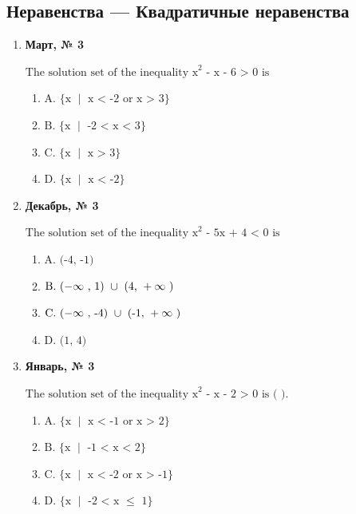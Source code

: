 \subsection*{Неравенства — Квадратичные неравенства}
\begin{enumerate}
\item \textbf{Март, № 3} \par \smallskip
$\displaystyle \text{The solution set of the inequality x}^{2}\text{ - x - 6 > 0 is}$
\begin{enumerate}
\item $\displaystyle \text{A. }\{\text{x }\mid\text{ x < -2 or x > 3}\}$
\item $\displaystyle \text{B. }\{\text{x }\mid\text{ -2 < x < 3}\}$
\item $\displaystyle \text{C. }\{\text{x }\mid\text{ x > 3}\}$
\item $\displaystyle \text{D. }\{\text{x }\mid\text{ x < -2}\}$
\end{enumerate}
\item \textbf{Декабрь, № 3} \par \smallskip
$\displaystyle \text{The solution set of the inequality x}^{2}\text{ - 5x + 4 < 0 is}$
\begin{enumerate}
\item $\displaystyle \text{A. (-4, -1)}$
\item $\displaystyle \text{B. }(-\infty\text{ , 1) }\cup\text{ (4, }+\infty\text{ )}$
\item $\displaystyle \text{C. }(-\infty\text{ , -4) }\cup\text{ (-1, }+\infty\text{ )}$
\item $\displaystyle \text{D. (1, 4)}$
\end{enumerate}
\item \textbf{Январь, № 3} \par \smallskip
$\displaystyle \text{The solution set of the inequality x}^{2}\text{ - x - 2 > 0 is ( ).}$
\begin{enumerate}
\item $\displaystyle \text{A. }\{\text{x }\mid\text{ x < -1 or x > 2}\}$
\item $\displaystyle \text{B. }\{\text{x }\mid\text{ -1 < x < 2}\}$
\item $\displaystyle \text{C. }\{\text{x }\mid\text{ x < -2 or x > -1}\}$
\item $\displaystyle \text{D. }\{\text{x }\mid\text{ -2 < x }\leq\text{  1}\}$
\end{enumerate}
\end{enumerate}

